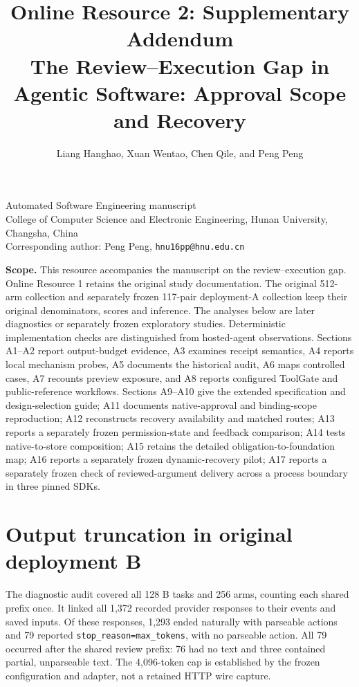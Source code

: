 \documentclass[10pt,a4paper]{article}
\title{Online Resource 2: Supplementary Addendum\protect\\
\large The Review--Execution Gap in Agentic Software: Approval Scope and Recovery}
\author{Liang Hanghao, Xuan Wentao, Chen Qile, and Peng Peng}
\date{}
\begin{document}
\maketitle
\begin{center}\small
Automated Software Engineering manuscript\\
College of Computer Science and Electronic Engineering, Hunan University, Changsha, China\\
Corresponding author: Peng Peng, \texttt{hnu16pp@hnu.edu.cn}
\end{center}
\noindent\textbf{Scope.} This resource accompanies the manuscript on the review--execution gap. Online Resource 1 retains the original study documentation. The original 512-arm collection and separately frozen 117-pair deployment-A collection keep their original denominators, scores and inference. The analyses below are later diagnostics or separately frozen exploratory studies. Deterministic implementation checks are distinguished from hosted-agent observations. Sections A1--A2 report output-budget evidence, A3 examines receipt semantics, A4 reports local mechanism probes, A5 documents the historical audit, A6 maps controlled cases, A7 recounts preview exposure, and A8 reports configured ToolGate and public-reference workflows. Sections A9--A10 give the extended specification and design-selection guide; A11 documents native-approval and binding-scope reproduction; A12 reconstructs recovery availability and matched routes; A13 reports a separately frozen permission-state and feedback comparison; A14 tests native-to-store composition; A15 retains the detailed obligation-to-foundation map; A16 reports a separately frozen dynamic-recovery pilot; A17 reports a separately frozen check of reviewed-argument delivery across a process boundary in three pinned SDKs.

\section{Output truncation in original deployment B}
The diagnostic audit covered all 128 B tasks and 256 arms, counting each shared prefix once. It linked all 1,372 recorded provider responses to their events and saved inputs. Of these responses, 1,293 ended naturally with parseable actions and 79 reported \texttt{stop\_reason=max\_tokens}, with no parseable action. All 79 occurred after the shared review prefix: 76 had no text and three contained partial, unparseable text. The 4,096-token cap is established by the frozen configuration and adapter, not a retained HTTP wire capture.
\end{document}
